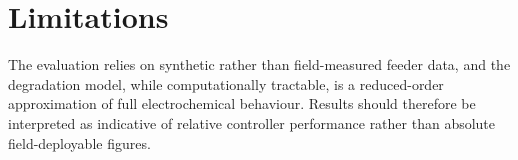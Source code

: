 \section{Limitations}

The evaluation relies on synthetic rather than field-measured feeder data, and the degradation model, while computationally tractable, is a reduced-order approximation of full electrochemical behaviour. Results should therefore be interpreted as indicative of relative controller performance rather than absolute field-deployable figures.

